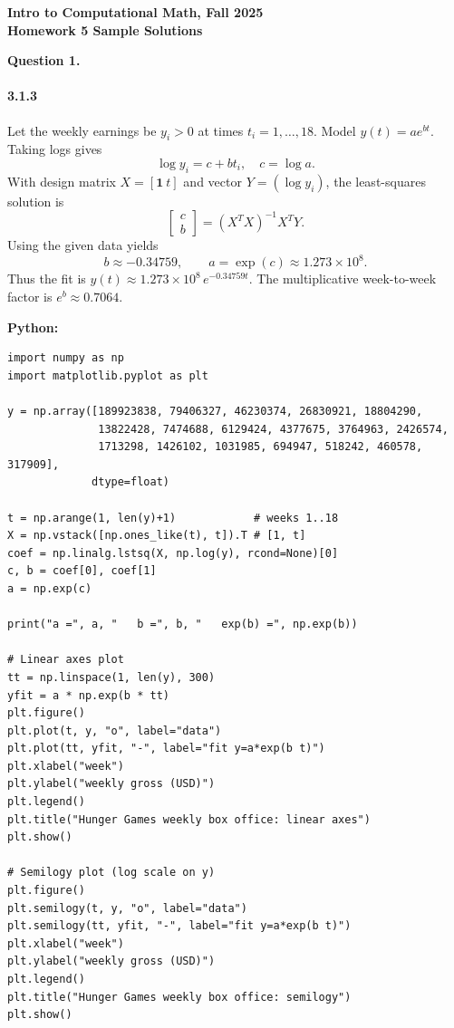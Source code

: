 \documentclass[11pt]{article}
\begin{document}
\begin{center}
{\bf Intro to Computational Math, Fall 2025\\
Homework 5 Sample Solutions}
\end{center}

{\bf Question 1.}

\paragraph{3.1.3}
Let the weekly earnings be $y_i>0$ at times $t_i=1,\dots,18$. Model $y(t)=a e^{b t}$. Taking logs gives
\[
\log y_i = c + b t_i,\quad c=\log a.
\]
With design matrix \(X=[\mathbf{1}\ t]\) and vector \(Y=(\log y_i)\), the least-squares solution is
\[
\begin{bmatrix}c\\ b\end{bmatrix}=(X^{T}X)^{-1}X^{T}Y.
\]
Using the given data yields
\[
b\approx -0.34759,\qquad a=\exp(c)\approx 1.273\times 10^{8}.
\]
Thus the fit is \(y(t)\approx 1.273\times 10^{8}\, e^{-0.34759 t}\). The multiplicative week-to-week factor is \(e^{b}\approx 0.7064\).

\medskip
\noindent\textbf{Python:}
\begin{verbatim}
import numpy as np
import matplotlib.pyplot as plt

y = np.array([189923838, 79406327, 46230374, 26830921, 18804290,
              13822428, 7474688, 6129424, 4377675, 3764963, 2426574,
              1713298, 1426102, 1031985, 694947, 518242, 460578, 317909],
             dtype=float)

t = np.arange(1, len(y)+1)            # weeks 1..18
X = np.vstack([np.ones_like(t), t]).T # [1, t]
coef = np.linalg.lstsq(X, np.log(y), rcond=None)[0]
c, b = coef[0], coef[1]
a = np.exp(c)

print("a =", a, "   b =", b, "   exp(b) =", np.exp(b))

# Linear axes plot
tt = np.linspace(1, len(y), 300)
yfit = a * np.exp(b * tt)
plt.figure()
plt.plot(t, y, "o", label="data")
plt.plot(tt, yfit, "-", label="fit y=a*exp(b t)")
plt.xlabel("week")
plt.ylabel("weekly gross (USD)")
plt.legend()
plt.title("Hunger Games weekly box office: linear axes")
plt.show()

# Semilogy plot (log scale on y)
plt.figure()
plt.semilogy(t, y, "o", label="data")
plt.semilogy(tt, yfit, "-", label="fit y=a*exp(b t)")
plt.xlabel("week")
plt.ylabel("weekly gross (USD)")
plt.legend()
plt.title("Hunger Games weekly box office: semilogy")
plt.show()
\end{verbatim}
\end{document}
